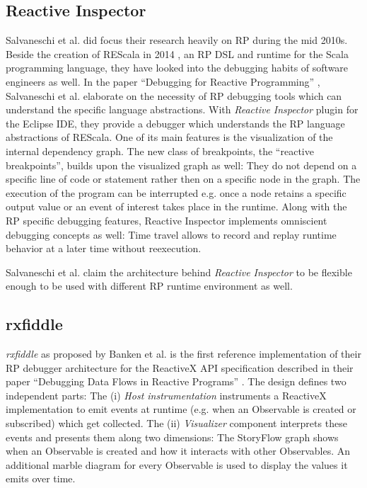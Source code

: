 \documentclass[12pt,a4paper]{article}
\begin{document}
\subsection{Reactive Inspector}

Salvaneschi et al. did focus their research heavily on RP during the mid 2010s. Beside the creation of REScala in 2014 \cite{10.1145/2577080.2577083}, an RP DSL and runtime for the Scala programming language, they have looked into the debugging habits of software engineers as well. In the paper ``Debugging for Reactive Programming'' \cite{10.1145/2884781.2884815}, Salvaneschi et al. elaborate on the necessity of RP debugging tools which can understand the specific language abstractions. With \emph{Reactive Inspector} plugin for the Eclipse IDE, they provide a debugger which understands the RP language abstractions of REScala. One of its main features is the visualization of the internal dependency graph. The new class of  breakpoints, the ``reactive breakpoints'', builds upon the visualized graph as well: They do not depend on a specific line of code or statement rather then on a specific node in the graph. The execution of the program can be interrupted e.g. once a node retains a specific output value or an event of interest takes place in the runtime. Along with the RP specific debugging features, Reactive Inspector implements omniscient debugging concepts as well: Time travel allows to record and replay runtime behavior at a later time without reexecution.

Salvaneschi et al. claim\cite{10.1145/2577080.2577083} the architecture behind \emph{Reactive Inspector} to be flexible enough to be used with different RP runtime environment as well.

\subsection{rxfiddle}

\emph{rxfiddle} as proposed by Banken et al. is the first reference implementation of their RP debugger architecture for the ReactiveX API specification described in their paper ``Debugging Data Flows in Reactive Programs'' \cite{10.1145/3180155.3180156}. The design defines two independent parts: The (i) \emph{Host instrumentation} instruments a ReactiveX implementation to emit events at runtime (e.g. when an Observable is created or subscribed) which get collected. The (ii) \emph{Visualizer} component interprets these events and presents them along two dimensions: The StoryFlow graph \cite{YWu2013a} shows when an Observable is created and how it interacts with other Observables. An additional marble diagram for every Observable is used to display the values it emits over time.
\end{document}
